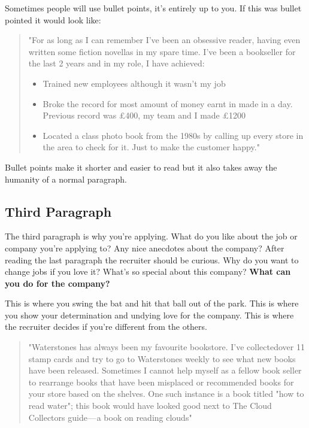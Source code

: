 \documentclass{article}
\begin{document}
Sometimes people will use bullet points, it's entirely up to you. If
this was bullet pointed it would look like:

\begin{quote}"For as long as I can remember I've been an obsessive reader, having even written some fiction novellas in my spare time. I've been a bookseller for the last 2 years and in my role, I have achieved:

\begin{itemize}
\item
  Trained new employees although it wasn't my job
\item
  Broke the record for most amount of money earnt in made in a day.
  Previous record was £400, my team and I made £1200
\item
  Located a class photo book from the 1980s by calling up every store in
  the area to check for it. Just to make the customer happy."
\end{itemize}
\end{quote}

Bullet points make it shorter and easier to read but it also takes away
the humanity of a normal paragraph.
\subsection{Third Paragraph}
The third paragraph is why you're applying. What do you like about the
job or company you're applying to? Any nice anecdotes about the company?
After reading the last paragraph the recruiter should be curious. Why do
you want to change jobs if you love it? What's so special about this
company? \textbf{What can you do for the company?}

This is where you swing the bat and hit that ball out of the park. This
is where you show your determination and undying love for the company.
This is where the recruiter decides if you're different from the others.

\begin{quote}"Waterstones has always been my favourite bookstore. I've collectedover 11 stamp cards and try to go to Waterstones weekly to see what new books have been released. Sometimes I cannot help myself as a fellow book seller to rearrange books that have been misplaced or recommended books for your store based on the shelves. One such instance is a book titled "how to read water"; this book would have looked good next to The Cloud Collectors guide --- a book on reading clouds"\end{quote}
\end{document}
